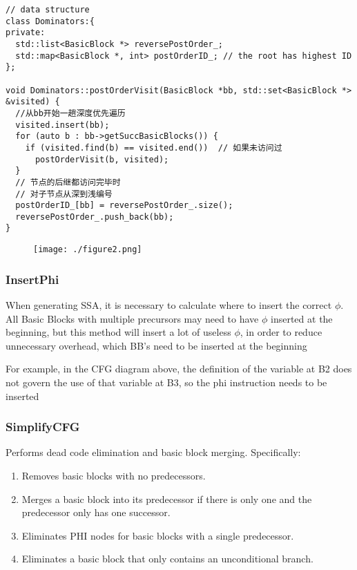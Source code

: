 \documentclass[a4paper]{exam}
\theoremstyle{definition}
\begin{document}
\begin{enumerate}
\begin{verbatim}
// data structure
class Dominators:{
private:
  std::list<BasicBlock *> reversePostOrder_;
  std::map<BasicBlock *, int> postOrderID_; // the root has highest ID
};

void Dominators::postOrderVisit(BasicBlock *bb, std::set<BasicBlock *> &visited) {
  //从bb开始一趟深度优先遍历
  visited.insert(bb);
  for (auto b : bb->getSuccBasicBlocks()) {
    if (visited.find(b) == visited.end())  // 如果未访问过
      postOrderVisit(b, visited);
  }
  // 节点的后继都访问完毕时
  // 对子节点从深到浅编号
  postOrderID_[bb] = reversePostOrder_.size();
  reversePostOrder_.push_back(bb);
}
\end{verbatim}
\begin{figure}[htbp]
  \centering
  \texttt{[image: ./figure2.png]}
\end{figure}
\end{enumerate}
\subsubsection{InsertPhi}
When generating SSA, it is necessary to calculate where to insert the correct $\phi$. All Basic Blocks with multiple precursors may need to have $\phi$ inserted at the beginning, but this method will insert a lot of useless $\phi$, in order to reduce unnecessary overhead, which BB's need to be inserted at the beginning

For example, in the CFG diagram above, the definition of the variable at B2 does not govern the use of that variable at B3, so the phi instruction needs to be inserted


\subsubsection{SimplifyCFG}
Performs dead code elimination and basic block merging. Specifically:

\begin{enumerate}
  \item Removes basic blocks with no predecessors.
  \item Merges a basic block into its predecessor if there is only one and the predecessor only has one successor.
  \item Eliminates PHI nodes for basic blocks with a single predecessor.
  \item Eliminates a basic block that only contains an unconditional branch.
\end{enumerate}
\end{document}
